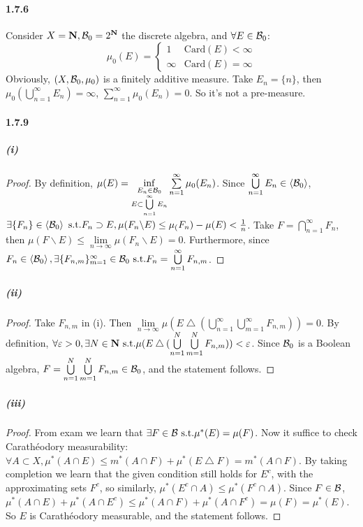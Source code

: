 \documentclass{article}
\begin{document}
\paragraph{1.7.6}
Consider $X=\mathbf{N}, \mathcal{B}_0=2^{\mathbf{N}}$ the discrete algebra, and $\forall E\in\mathcal{B}_0$:
\[\mu_0(E)=\begin{cases}
1 &\mathrm{Card}(E)<\infty\\
\infty &\mathrm{Card}(E)=\infty
\end{cases}\]
Obviously, $(X,\mathcal{B}_0,\mu_0)$ is a finitely additive measure. 
Take $E_n=\{n\}$, then $\mu_0(\bigcup\limits_{n=1}^{\infty}E_n)=\infty$, $\sum\limits_{n=1}^\infty\mu_0(E_n)=0$. So it's not a pre-measure.

\paragraph{1.7.9}
\subparagraph{(i)}
\begin{proof}
By definition, $\mu(E)=\inf\limits_{\substack{E_n\in \mathcal{B}_0\\E\subset\bigcup\limits_{n=1}^\infty E_n}}\sum\limits_{n=1}^\infty\mu_0(E_n)$. Since $\bigcup\limits_{n=1}^\infty E_n\in\left<\mathcal{B}_0\right>$, $\exists \{F_n\}\in \left<\mathcal{B}_0\right> \text{ s.t.} F_n\supset E, \mu(F_n\backslash E)\leq \mu_(F_n)-\mu(E)<\frac 1 n$. Take $F=\bigcap\limits_{n=1}^\infty F_n$, then $\mu(F\backslash E)\leq\lim\limits_{n\to\infty}\mu(F_n\backslash E)=0$. Furthermore, since $F_n\in\left<\mathcal{B}_0\right>, \exists\{F_{n,m}\}_{m=1}^\infty\in\mathcal{B}_0\text{ s.t.} F_n=\bigcup\limits_{n=1}^{\infty}F_{n,m}$.
\end{proof}
\subparagraph{(ii)}
\begin{proof}
Take $F_{n,m}$ in (i). Then $\lim\limits_{n\to\infty}\mu(E\bigtriangleup (\bigcup\limits_{n=1}^{\infty}\bigcup\limits_{m=1}^{\infty}F_{n,m}))=0$. By definition, $\forall \varepsilon>0,\exists N\in\mathbf{N}\text{ s.t.} \mu(E\bigtriangleup (\bigcup\limits_{n=1}^{N}\bigcup\limits_{m=1}^{N}F_{n,m}))<\varepsilon$. Since $\mathcal{B}_0$ is a Boolean algebra, $F=\bigcup\limits_{n=1}^{N}\bigcup\limits_{m=1}^{N}F_{n,m}\in\mathcal{B}_0$, and the statement follows.
\end{proof}
\subparagraph{(iii)}
\begin{proof}
From exam we learn that $\exists F\in\mathcal{B}\text{ s.t.} \mu^*(E)=\mu(F)$. Now it suffice to check Carath\'eodory measurability: $\forall A\subset X, \mu^*(A\cap E)\leq m^*(A\cap F)+\mu^*(E\bigtriangleup F)=m^*(A\cap F)$. By taking completion we learn that the given condition still holds for $E^c$, with the approximating sets $F^c$, so similarly, $\mu^*(E^c\cap A)\leq \mu^*(F^c\cap A)$. Since $F\in\mathcal{B}$, $\mu^*(A\cap E)+\mu^*(A\cap E^c)\leq \mu^*(A\cap F)+\mu^*(A\cap F^c)=\mu(F)=\mu^*(E)$. So $E$ is Carath\'eodory measurable, and the statement follows.
\end{proof}
\end{document}
